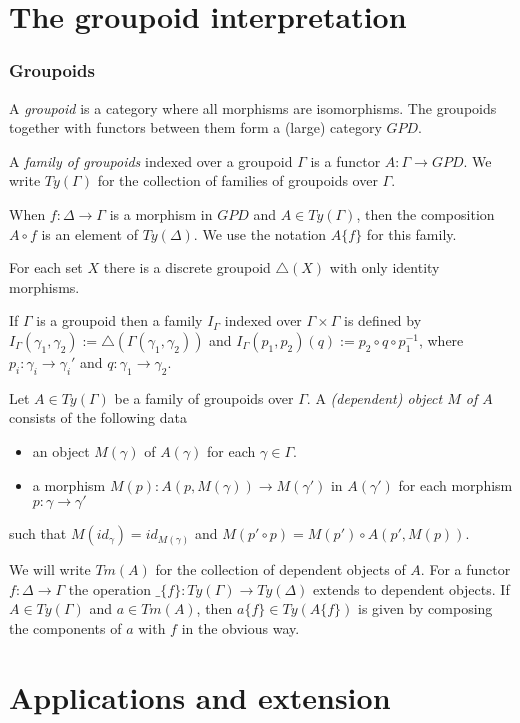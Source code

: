 \documentclass[handout,xcolor=dvipsnames]{beamer}
\begin{document}
\section{The groupoid interpretation}

\begin{frame}
  \frametitle{Groupoids}
\begin{definition}
A \emph{groupoid} is a category where all morphisms are isomorphisms. The
groupoids together with functors between them form a (large) category $GPD$. 
\end{definition}

\pause
\begin{definition}
A \emph{family of groupoids} indexed over a groupoid $\Gamma$ is a functor
$A:\Gamma\to GPD$. We write $Ty(\Gamma)$ for the collection of families of
groupoids over $\Gamma$. 
\end{definition}

\pause
When $f:\Delta\to\Gamma$ is a morphism in $GPD$ and $A\in Ty(\Gamma)$,
then the composition $A\circ f$ is an element of $Ty(\Delta)$. We use the
notation $A\{f\}$ for this family.
\end{frame}

\begin{frame}
\begin{example}
For each set $X$ there is a discrete groupoid $\triangle(X)$ with only identity
morphisms.

If $\Gamma$ is a groupoid then a family $I_\Gamma$ indexed over $\Gamma\times
\Gamma$ is defined by $I_\Gamma(\gamma_1,\gamma_2):=\triangle(\Gamma(\gamma_1,
\gamma_2))$ and $I_\Gamma(p_1,p_2)(q):= p_2\circ q \circ p_1^{-1}$, where
$p_i:\gamma_i\to\gamma_i'$ and $q:\gamma_1\to\gamma_2$.
\end{example}

\begin{definition}
Let $A\in Ty(\Gamma)$ be a family of groupoids over $\Gamma$. A
\emph{(dependent) object $M$ of $A$} consists of the following data
\begin{itemize}
\item an object $M(\gamma)$ of $A(\gamma)$ for each $\gamma\in\Gamma$.
\item a morphism $M(p):A(p,M(\gamma))\to M(\gamma')$ in $A(\gamma')$ for each
morphism $p:\gamma\to\gamma'$
\end{itemize}
such that $M(id_\gamma)=id_{M(\gamma)}$ and $M(p'\circ p)=M(p')\circ A(p',M(p))$.

We will write $Tm(A)$ for the collection of dependent objects of $A$. For a
functor $f:\Delta\to\Gamma$ the operation $\_\{f\}:Ty(\Gamma)\to Ty(\Delta)$
extends to dependent objects. If $A\in Ty(\Gamma)$ and $a\in Tm(A)$, then
$a\{f\}\in Ty(A\{f\})$ is given by composing the components of $a$ with $f$ in
the obvious way.
\end{definition}
\end{frame}

\section{Applications and extension}
\end{document}
